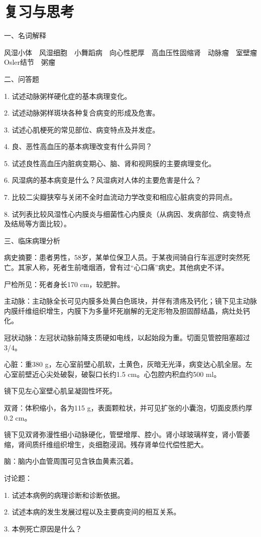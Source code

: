 \section*{复习与思考}

{一、名词解释}

风湿小体　风湿细胞　小舞蹈病　向心性肥厚　高血压性固缩肾　动脉瘤　室壁瘤　Osler结节　粥瘤

{二、问答题}

1. 试述动脉粥样硬化症的基本病理变化。

2. 试述动脉粥样斑块各种复合病变的形成及危害。

3. 试述心肌梗死的常见部位、病变特点及并发症。

4. 良、恶性高血压的基本病理改变有什么异同？

5. 试述良性高血压内脏病变期心、脑、肾和视网膜的主要病理变化。

6. 风湿病的基本病变是什么？风湿病对人体的主要危害是什么？

7. 比较二尖瓣狭窄与关闭不全时血流动力学改变和相应心脏病变的异同点。

8.
试列表比较风湿性心内膜炎与细菌性心内膜炎（从病因、发病部位、病变特点及结局等方面比较）。

{三、临床病理分析}

病史摘要：患者男性，58岁，某单位保卫人员。于某夜间骑自行车巡逻时突然死亡。其家人称，死者生前嗜烟酒，曾有过“心口痛”病史。其他病史不详。

尸检所见：死者身长170 cm，较肥胖。

主动脉：主动脉全长可见内膜多处黄白色斑块，并伴有溃疡及钙化；镜下见主动脉内膜纤维组织增生，内膜下为多量坏死崩解的无定形物及胆固醇结晶，病灶处钙化。

冠状动脉：左冠状动脉前降支质硬如电线，以起始段为重。切面见管腔阻塞超过3/4。

心脏：重380
g，左心室前壁心肌软，土黄色，灰暗无光泽，病变达心肌全层。左心室前壁近心尖处破裂，破裂口长约1.5
cm。心包腔内积血约500 ml。

镜下见左心室壁心肌呈凝固性坏死。

双肾：体积缩小，各为115
g，表面颗粒状，并可见扩张的小囊泡，切面皮质约厚0.2 cm。

镜下见双肾弥漫性细小动脉硬化，管壁增厚、腔小。肾小球玻璃样变，肾小管萎缩，肾间质纤维组织增生，炎细胞浸润。残存肾单位代偿性肥大。

脑：脑内小血管周围可见含铁血黄素沉着。

讨论题：

1. 试述本病例的病理诊断和诊断依据。

2. 试述本病的发生发展过程以及主要病变间的相互关系。

3. 本例死亡原因是什么？